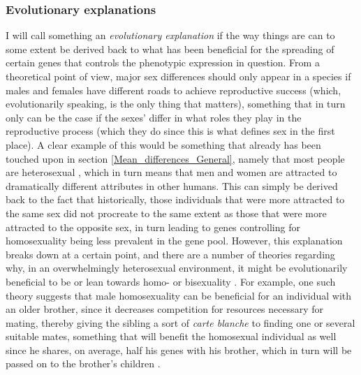 \subsubsection{Evolutionary explanations} \label{Evolutionary_explanations} I will call something an \emph{evolutionary explanation} if the way things are can to some extent be derived back to what has been beneficial for the spreading of certain genes that controls the phenotypic expression in question. From a theoretical point of view, major sex differences should only appear in a species if males and females have different roads to achieve reproductive success (which, evolutionarily speaking, is the only thing that matters), something that in turn only can be the case if the sexes' differ in what roles they play in the reproductive process (which they do since this is what defines sex in the first place). A clear example of this would be something that already has been touched upon in section \ref{Mean_differences_General}, namely that most people are heterosexual \parencite{Bailey2016}, which in turn means that men and women are attracted to dramatically different attributes in other humans. This can simply be derived back to the fact that historically, those individuals that were more attracted to the same sex did not procreate to the same extent as those that were more attracted to the opposite sex, in turn leading to genes controlling for homosexuality being less prevalent in the gene pool. However, this explanation breaks down at a certain point, and there are a number of theories regarding why, in an overwhelmingly heterosexual environment, it might be evolutionarily beneficial to be or lean towards homo- or bisexuality \parencite{Savolainen2016}. For example, one such theory suggests that male homosexuality can be beneficial for an individual with an older brother, since it decreases competition for resources necessary for mating, thereby giving the sibling a sort of \emph{carte blanche} to finding one or several suitable mates, something that will benefit the homosexual individual as well since he shares, on average, half his genes with his brother, which in turn will be passed on to the brother's children \parencite{Apostolou2013}.

